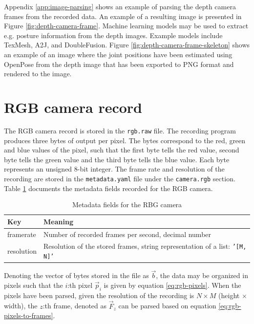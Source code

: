 Appendix \ref{app:image-parsing} shows an example of parsing the depth camera frames from the recorded data.
An example of a resulting image is presented in Figure \ref{fig:depth-camera-frame}.
Machine learning models may be used to extract e.g. posture information from the depth images.
Example models include TexMesh\cite{tex-mesh}, A2J\cite{a2j}, and DoubleFusion\cite{double-fusion}.
Figure \ref{fig:depth-camera-frame-skeleton} shows an example of an image where the joint positions have been estimated using
OpenPose \cite{openpose} from the depth image that has been exported to PNG format and rendered to the image.

\section{RGB camera record}
\label{sec:rgb-file}
The RGB camera record is stored in the \texttt{rgb.raw} file.
The recording program produces three bytes of output per pixel. 
The bytes correspond to the red, green and blue values of the pixel,
such that the first byte tells the red value,
second byte tells the green value and the third byte tells the blue value.
Each byte represents an unsigned 8-bit integer.
The frame rate and resolution of the recording are stored in the \texttt{metadata.yaml} file
under the \texttt{camera.rgb} section.
Table \ref{tab:rgb-metadata} documents the metadata fields recorded for the RGB camera.

\begin{table}
    \begin{tabular}{l l}
        \toprule
        \textbf{Key} & \textbf{Meaning} \\
        \midrule
        framerate & Number of recorded frames per second, decimal number \\
        resolution & Resolution of the stored frames, string representation of a list: \texttt{'[M, N]'} \\
        \bottomrule
    \end{tabular}
    \caption{Metadata fields for the RBG camera}
    \label{tab:rgb-metadata}
\end{table}

Denoting the vector of bytes stored in the file as $\vec{b}$,
the data may be organized in pixels such that the $i$:th pixel $\vec{p}_{i}$ is given by equation \ref{eq:rgb-pixels}.
When the pixels have been parsed, given the resolution of the recording is $N \times M$ (height $\times$ width),
the $z$:th frame, denoted as $\vec{F}_z$ can be parsed based on equation \ref{eq:rgb-pixels-to-frames}.

